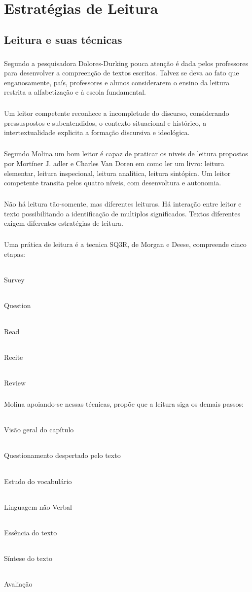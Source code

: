 \chapter{Estratégias de Leitura}
\section{Leitura e suas técnicas}
\paragraph{}
Segundo a pesquisadora Dolores-Durking pouca atenção é dada pelos professores para desenvolver a compreenção de textos escritos. Talvez se deva ao fato que enganosamente, país, professores e alunos considerarem o ensino da leitura restrita a alfabetização e à escola fundamental.
\paragraph{}
Um leitor competente reconhece a incompletude do discurso, considerando pressuspostos e subentendidos, o contexto situacional e histórico, a intertextualidade explicita a formação discursiva e ideológica.
\paragraph{}
Segundo Molina um bom leitor é capaz de praticar os niveis de leitura propostos por Mortíner J. adler e Charles Van Doren em como ler um livro: leitura elementar, leitura inspecional, leitura analítica, leitura sintópica. Um leitor competente transita pelos quatro níveis, com desenvoltura e autonomia.
\paragraph{}
Não há leitura tão-somente, mas diferentes leituras. Há interação entre leitor e texto possibilitando a identificação de multiplos significados. Textos diferentes exigem diferentes estratégias de leitura.
\paragraph{}
Uma prática de leitura é a tecnica SQ3R, de Morgan e Deese, compreende cinco etapas:
\subparagraph{}
Survey
\subparagraph{}
Question
\subparagraph{}
Read
\subparagraph{}
Recite
\subparagraph{}
Review
\paragraph{}
Molina apoiando-se nessas técnicas, propõe que a leitura siga os demais passos:
\subparagraph{}
Visão geral do capítulo
\subparagraph{}
Questionamento despertado pelo texto
\subparagraph{}
Estudo do vocabulário
\subparagraph{}
Linguagem não Verbal
\subparagraph{}
Essência do texto
\subparagraph{}
Síntese do texto
\subparagraph{}
Avaliação

